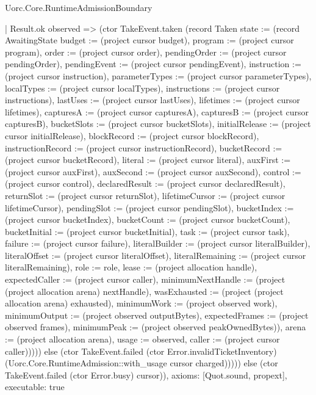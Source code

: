 \begin{lexlean}{Uorc.Core.RuntimeAdmissionBoundary}
\begin{semanticmodule}
{        | Result.ok observed => (ctor TakeEvent.taken (record Taken {state := (record AwaitingState {budget := (project cursor budget), program := (project cursor program), order := (project cursor order), pendingOrder := (project cursor pendingOrder), pendingEvent := (project cursor pendingEvent), instruction := (project cursor instruction), parameterTypes := (project cursor parameterTypes), localTypes := (project cursor localTypes), instructions := (project cursor instructions), lastUses := (project cursor lastUses), lifetimes := (project cursor lifetimes), capturesA := (project cursor capturesA), capturesB := (project cursor capturesB), bucketSlots := (project cursor bucketSlots), initialRelease := (project cursor initialRelease), blockRecord := (project cursor blockRecord), instructionRecord := (project cursor instructionRecord), bucketRecord := (project cursor bucketRecord), literal := (project cursor literal), auxFirst := (project cursor auxFirst), auxSecond := (project cursor auxSecond), control := (project cursor control), declaredResult := (project cursor declaredResult), returnSlot := (project cursor returnSlot), lifetimeCursor := (project cursor lifetimeCursor), pendingSlot := (project cursor pendingSlot), bucketIndex := (project cursor bucketIndex), bucketCount := (project cursor bucketCount), bucketInitial := (project cursor bucketInitial), task := (project cursor task), failure := (project cursor failure), literalBuilder := (project cursor literalBuilder), literalOffset := (project cursor literalOffset), literalRemaining := (project cursor literalRemaining), role := role, lease := (project allocation handle), expectedCaller := (project cursor caller), minimumNextHandle := (project (project allocation arena) nextHandle), wasExhausted := (project (project allocation arena) exhausted), minimumWork := (project observed work), minimumOutput := (project observed outputBytes), expectedFrames := (project observed frames), minimumPeak := (project observed peakOwnedBytes)}), arena := (project allocation arena), usage := observed, caller := (project cursor caller)})))) else (ctor TakeEvent.failed (ctor Error.invalidTicketInventory) (Uorc.Core.RuntimeAdmission::with_usage cursor charged))))) else (ctor TakeEvent.failed (ctor Error.busy) cursor)),
  axioms: [Quot.sound, propext],
  executable: true
}


\end{semanticmodule}
\end{lexlean}
